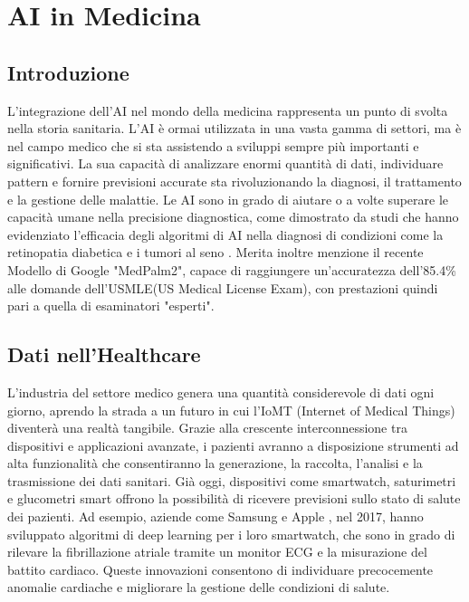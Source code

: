 \chapter{AI in Medicina}
\label{ch:capitolo1}




\section{Introduzione}
L'integrazione dell'AI nel mondo della medicina rappresenta un punto di svolta nella storia sanitaria. L'AI è ormai utilizzata in una vasta gamma di settori, ma è nel campo medico che si sta assistendo a sviluppi sempre più importanti e significativi. La sua capacità di analizzare enormi quantità di dati, individuare pattern e fornire previsioni accurate sta rivoluzionando la diagnosi, il trattamento e la gestione delle malattie. Le AI sono in grado di aiutare o a volte superare le capacità umane nella precisione diagnostica, come dimostrato da studi che hanno evidenziato l'efficacia degli algoritmi di AI nella diagnosi di condizioni come la retinopatia diabetica\cite{articolo1_retinopatia}\cite{articolo2_retinopatia} e i tumori al seno \cite{articolo1_breastcancer} \cite{articolo2_breastcancer}.
Merita inoltre menzione il recente Modello di Google "MedPalm2", capace  di raggiungere un'accuratezza dell'85.4\% alle domande dell'USMLE(US Medical License Exam), con prestazioni quindi pari a quella di esaminatori "esperti".
\cite{GoogleMedpalm2}

\section{Dati nell'Healthcare}

L'industria del settore medico genera una quantità considerevole di dati ogni giorno, aprendo la strada a un futuro in cui l'IoMT (Internet of Medical Things) diventerà una realtà tangibile. Grazie alla crescente interconnessione tra dispositivi e applicazioni avanzate, i pazienti avranno a disposizione strumenti ad alta funzionalità che consentiranno la generazione, la raccolta, l'analisi e la trasmissione dei dati sanitari. Già oggi, dispositivi come smartwatch, saturimetri e glucometri smart offrono la possibilità di ricevere previsioni sullo stato di salute dei pazienti. Ad esempio, aziende come Samsung \cite{Samsung} e Apple \cite{Apple}, nel 2017, hanno sviluppato algoritmi di deep learning per i loro smartwatch, che sono in grado di rilevare la fibrillazione atriale tramite un monitor ECG e la misurazione del battito cardiaco. Queste innovazioni consentono di individuare precocemente anomalie cardiache e migliorare la gestione delle condizioni di salute.


